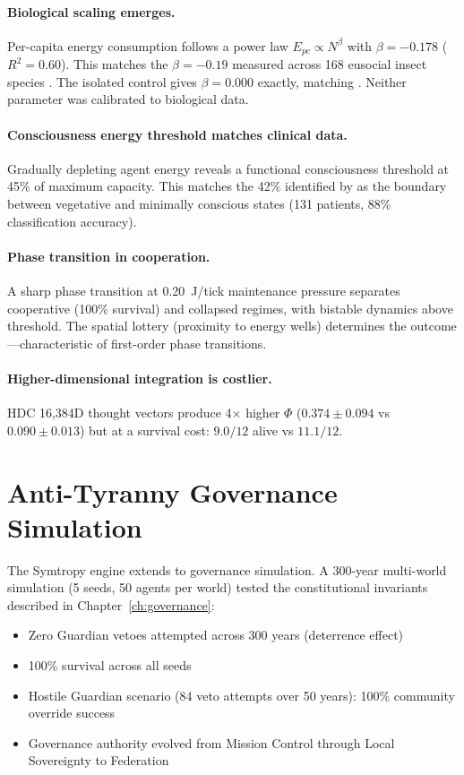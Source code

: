 \documentclass[12pt]{book}
\begin{document}
\paragraph{Biological scaling emerges.} Per-capita energy consumption follows a power law $E_{pc} \propto N^{\beta}$ with $\beta = -0.178$ ($R^2 = 0.60$). This matches the $\beta = -0.19$ measured across 168 eusocial insect species \citep{hou2010}. The isolated control gives $\beta = 0.000$ exactly, matching \citet{waters2010}. Neither parameter was calibrated to biological data.

\paragraph{Consciousness energy threshold matches clinical data.} Gradually depleting agent energy reveals a functional consciousness threshold at 45\% of maximum capacity. This matches the 42\% identified by \citet{stender2015} as the boundary between vegetative and minimally conscious states (131 patients, 88\% classification accuracy).

\paragraph{Phase transition in cooperation.} A sharp phase transition at 0.20~J/tick maintenance pressure separates cooperative (100\% survival) and collapsed regimes, with bistable dynamics above threshold. The spatial lottery (proximity to energy wells) determines the outcome---characteristic of first-order phase transitions.

\paragraph{Higher-dimensional integration is costlier.} HDC 16,384D thought vectors produce 4$\times$ higher $\Phi$ ($0.374 \pm 0.094$ vs $0.090 \pm 0.013$) but at a survival cost: $9.0/12$ alive vs $11.1/12$.

\section{Anti-Tyranny Governance Simulation}

The Symtropy engine extends to governance simulation. A 300-year multi-world simulation (5 seeds, 50 agents per world) tested the constitutional invariants described in Chapter~\ref{ch:governance}:

\begin{itemize}[nosep]
  \item Zero Guardian vetoes attempted across 300 years (deterrence effect)
  \item 100\% survival across all seeds
  \item Hostile Guardian scenario (84 veto attempts over 50 years): 100\% community override success
  \item Governance authority evolved from Mission Control through Local Sovereignty to Federation
\end{itemize}
\end{document}
